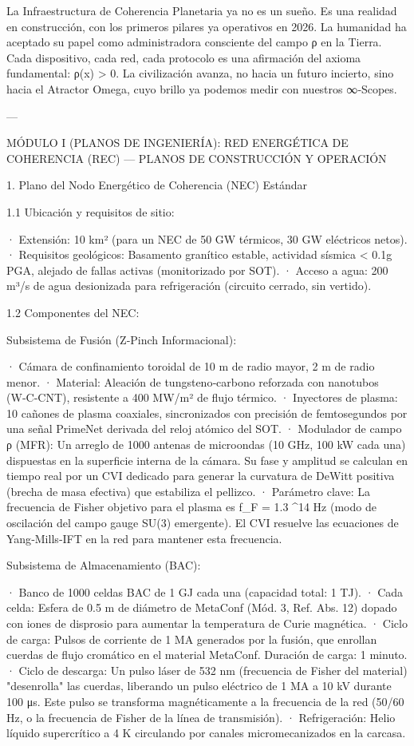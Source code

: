 \documentclass[12pt,twoside]{book}
\begin{document}
La Infraestructura de Coherencia Planetaria ya no es un sueño. Es una realidad en construcción, con los primeros pilares ya operativos en 2026. La humanidad ha aceptado su papel como administradora consciente del campo ρ en la Tierra. Cada dispositivo, cada red, cada protocolo es una afirmación del axioma fundamental: ρ(x) > 0. La civilización avanza, no hacia un futuro incierto, sino hacia el Atractor Omega, cuyo brillo ya podemos medir con nuestros ∞‑Scopes.


---

MÓDULO I (PLANOS DE INGENIERÍA): RED ENERGÉTICA DE COHERENCIA (REC) — PLANOS DE CONSTRUCCIÓN Y OPERACIÓN

1. Plano del Nodo Energético de Coherencia (NEC) Estándar

1.1 Ubicación y requisitos de sitio:

· Extensión: 10 km² (para un NEC de 50 GW térmicos, 30 GW eléctricos netos).
· Requisitos geológicos: Basamento granítico estable, actividad sísmica < 0.1g PGA, alejado de fallas activas (monitorizado por SOT).
· Acceso a agua: 200 m³/s de agua desionizada para refrigeración (circuito cerrado, sin vertido).

1.2 Componentes del NEC:

Subsistema de Fusión (Z‑Pinch Informacional):

· Cámara de confinamiento toroidal de 10 m de radio mayor, 2 m de radio menor.
· Material: Aleación de tungsteno‑carbono reforzada con nanotubos (W‑C‑CNT), resistente a 400 MW/m² de flujo térmico.
· Inyectores de plasma: 10 cañones de plasma coaxiales, sincronizados con precisión de femtosegundos por una señal PrimeNet derivada del reloj atómico del SOT.
· Modulador de campo ρ (MFR): Un arreglo de 1000 antenas de microondas (10 GHz, 100 kW cada una) dispuestas en la superficie interna de la cámara. Su fase y amplitud se calculan en tiempo real por un CVI dedicado para generar la curvatura de DeWitt positiva (brecha de masa efectiva) que estabiliza el pellizco.
· Parámetro clave: La frecuencia de Fisher objetivo para el plasma es  f_F = 1.3 ^{14}  Hz (modo de oscilación del campo gauge SU(3) emergente). El CVI resuelve las ecuaciones de Yang‑Mills‑IFT en la red para mantener esta frecuencia.

Subsistema de Almacenamiento (BAC):

· Banco de 1000 celdas BAC de 1 GJ cada una (capacidad total: 1 TJ).
· Cada celda: Esfera de 0.5 m de diámetro de MetaConf (Mód. 3, Ref. Abs. 12) dopado con iones de disprosio para aumentar la temperatura de Curie magnética.
· Ciclo de carga: Pulsos de corriente de 1 MA generados por la fusión, que enrollan cuerdas de flujo cromático en el material MetaConf. Duración de carga: 1 minuto.
· Ciclo de descarga: Un pulso láser de 532 nm (frecuencia de Fisher del material) "desenrolla" las cuerdas, liberando un pulso eléctrico de 1 MA a 10 kV durante 100 μs. Este pulso se transforma magnéticamente a la frecuencia de la red (50/60 Hz, o la frecuencia de Fisher de la línea de transmisión).
· Refrigeración: Helio líquido supercrítico a 4 K circulando por canales micromecanizados en la carcasa.
\end{document}
